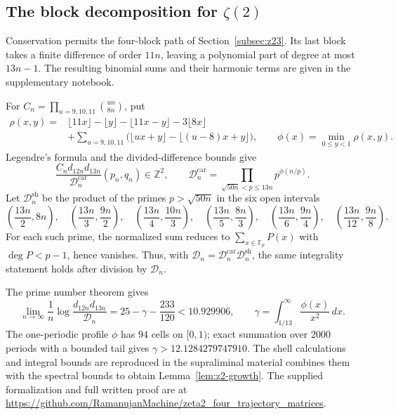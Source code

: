 \subsection{The block decomposition for \texorpdfstring{$\zeta(2)$}{zeta(2)}}
\label{app:z2-blocks}

Conservation permits the four-block path of
Section~\ref{subsec:z23}. Its last block takes a finite
difference of order $11n$, leaving a polynomial part of degree at most
$13n-1$. The resulting binomial sums and their harmonic terms are given
in the supplementary notebook.

For $C_n=\prod_{u=9,10,11}\binom{un}{8n}$, put
\[
\begin{aligned}
 \rho(x,y)={}&\lfloor11x\rfloor-\lfloor y\rfloor-\lfloor11x-y\rfloor
             -3\lfloor8x\rfloor\\
 &+\sum_{u=9,10,11}
   \bigl(\lfloor ux+y\rfloor-\lfloor(u-8)x+y\rfloor\bigr),
 \qquad \phi(x)=\min_{0\le y<1}\rho(x,y).
\end{aligned}
\]
Legendre's formula and the divided-difference bounds give
\[
 \frac{C_nd_{12n}d_{13n}}{\mathcal D_n^{\mathrm{car}}}
 (p_n,q_n)\in\mathbb Z^2,\qquad
 \mathcal D_n^{\mathrm{car}}
 =\prod_{\sqrt{50n}<p\le13n}p^{\phi(n/p)}.
\]
Let $\mathcal D_n^{\mathrm{sh}}$ be the product of the primes
$p>\sqrt{50n}$ in the six open intervals
\[
 \left(\frac{13n}{2},8n\right),\quad
 \left(\frac{13n}{3},\frac{9n}{2}\right),\quad
 \left(\frac{13n}{4},\frac{10n}{3}\right),\quad
 \left(\frac{13n}{5},\frac{8n}{3}\right),\quad
 \left(\frac{13n}{6},\frac{9n}{4}\right),\quad
 \left(\frac{13n}{12},\frac{9n}{8}\right).
\]
For each such prime, the normalized sum reduces to
$\sum_{x\in\mathbb F_p}P(x)$ with $\deg P<p-1$, hence vanishes.
Thus, with $\mathcal D_n=\mathcal D_n^{\mathrm{car}}
\mathcal D_n^{\mathrm{sh}}$, the same integrality statement holds
after division by $\mathcal D_n$.

The prime number theorem gives
\[
 \lim_{n\to\infty}\frac1n
 \log\frac{d_{12n}d_{13n}}{\mathcal D_n}
 =25-\gamma-\frac{233}{120}<10.929906,\qquad
 \gamma=\int_{1/13}^{\infty}\frac{\phi(x)}{x^2}\,dx.
\]
The one-periodic profile $\phi$ has $94$ cells on $[0,1)$;
exact summation over $2000$ periods with a bounded tail gives
$\gamma>12.1284279747910$.
The shell calculations and integral bounds are reproduced in
the supraliminal material
combines them with the spectral bounds to obtain Lemma~\ref{lem:z2-growth}.
The supplied formalization and full written proof are at
\url{https://github.com/RamanujanMachine/zeta2_four_trajectory_matrices}.

